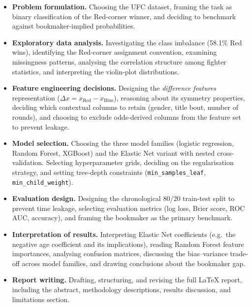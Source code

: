\begin{itemize}
  \item \textbf{Problem formulation.}
    Choosing the UFC dataset, framing the task as binary classification of the
    Red-corner winner, and deciding to benchmark against bookmaker-implied
    probabilities.

  \item \textbf{Exploratory data analysis.}
    Investigating the class imbalance (58.1\% Red wins), identifying the
    Red-corner assignment convention, examining missingness patterns,
    analysing the correlation structure among fighter statistics,
    and interpreting the violin-plot distributions.

  \item \textbf{Feature engineering decisions.}
    Designing the \emph{difference features} representation
    ($\Delta x = x_{\text{Red}} - x_{\text{Blue}}$), reasoning about its
    symmetry properties, deciding which contextual columns to retain
    (gender, title bout, number of rounds), and choosing to exclude
    odds-derived columns from the feature set to prevent leakage.

  \item \textbf{Model selection.}
    Choosing the three model families (logistic regression, Random Forest,
    XGBoost) and the Elastic Net variant with nested cross-validation.
    Selecting hyperparameter grids, deciding on the regularisation strategy,
    and setting tree-depth constraints (\texttt{min\_samples\_leaf},
    \texttt{min\_child\_weight}).

  \item \textbf{Evaluation design.}
    Designing the chronological 80/20 train-test split to prevent time
    leakage, selecting evaluation metrics (log loss, Brier score, ROC AUC,
    accuracy), and framing the bookmaker as the primary benchmark.

  \item \textbf{Interpretation of results.}
    Interpreting Elastic Net coefficients (e.g.\ the negative age coefficient
    and its implications), reading Random Forest feature importances,
    analysing confusion matrices, discussing the bias--variance trade-off
    across model families, and drawing conclusions about the bookmaker gap.

  \item \textbf{Report writing.}
    Drafting, structuring, and revising the full \LaTeX{} report, including
    the abstract, methodology descriptions, results discussion, and
    limitations section.
\end{itemize}


